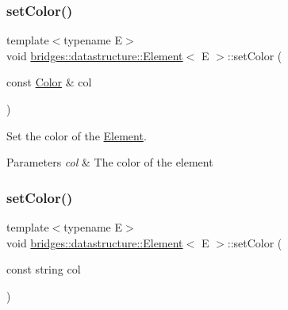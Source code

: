 \mbox{\label{classbridges_1_1datastructure_1_1_element_a17d75aae50a48b3404f3c6811c62ae1c}} 
\subsubsection{\texorpdfstring{set\+Color()}{setColor()}\hspace{0.1cm}{\footnotesize\ttfamily [1/2]}}
{\footnotesize\ttfamily template$<$typename E$>$ \\
void \hyperlink{classbridges_1_1datastructure_1_1_element}{bridges\+::datastructure\+::\+Element}$<$ E $>$\+::set\+Color (\begin{DoxyParamCaption}\item[{const \hyperlink{classbridges_1_1datastructure_1_1_color}{Color} \&}]{col }\end{DoxyParamCaption})\hspace{0.3cm}{\ttfamily [inline]}}



Set the color of the \hyperlink{classbridges_1_1datastructure_1_1_element}{Element}. 


\begin{DoxyParams}{Parameters}
{\em col} & The color of the element \\
\hline
\end{DoxyParams}
\mbox{\label{classbridges_1_1datastructure_1_1_element_a3792c8d514f4d644d739c6124f26bcbf}} 
\subsubsection{\texorpdfstring{set\+Color()}{setColor()}\hspace{0.1cm}{\footnotesize\ttfamily [2/2]}}
{\footnotesize\ttfamily template$<$typename E$>$ \\
void \hyperlink{classbridges_1_1datastructure_1_1_element}{bridges\+::datastructure\+::\+Element}$<$ E $>$\+::set\+Color (\begin{DoxyParamCaption}\item[{const string}]{col }\end{DoxyParamCaption})\hspace{0.3cm}{\ttfamily [inline]}}



